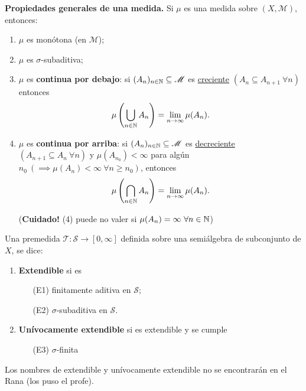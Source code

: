\noindent \textbf{Propiedades generales de una medida.} Si $\mu$ es una medida sobre $(X,\mathscr{M})$, entonces:
\begin{enumerate}
	\item $\mu$ es monótona (en $\mathscr{M}$);

	\item $\mu$ es $\sigma$-subaditiva;

	\item $\mu$ es \textbf{continua por debajo}: si $(A_n)_{n\in\mathbb{N}} \subseteq \mathscr{M}$ es \underline{creciente} $(A_n \subseteq A_{n+1}\ \forall n)$ entonces
	\[ \mu \left( \bigcup_{n\in\mathbb{N}} A_n \right) = \lim_{n \to \infty} \mu(A_n). \]

	\item $\mu$ es \textbf{continua por arriba}: si $(A_n)_{n\in\mathbb{N}} \subseteq \mathscr{M}$ es \underline{decreciente} $(A_{n+1} \subseteq A_n\ \forall n)$ y $\mu(A_{n_0})<\infty$ para algún $n_0\ (\implies \mu(A_n)<\infty\ \forall n\geq n_0)$, entonces
	\[ \mu \left( \bigcap_{n\in\mathbb{N}}A_n \right) = \lim_{n \to \infty} \mu(A_n). \]

	\noindent (\textbf{Cuidado!} (4) puede no valer si $\mu (A_n) = \infty \ \forall n \in \mathbb{N}$)
\end{enumerate}

\begin{definition}
	Una premedida $\mathcal{T} : \mathscr{S} \to [0,\infty]$ definida sobre una semiálgebra de subconjunto de $X$, se dice:
	\begin{enumerate}
		\item \textbf{Extendible} si es
		\begin{enumerate}
			\item[(E1)] finitamente aditiva en $\mathscr{S}$;

			\item[(E2)] $\sigma$-subaditiva en $\mathscr{S}$.
		\end{enumerate}

		\item \textbf{Unívocamente extendible} si es extendible y se cumple
		\begin{enumerate}
			\item[(E3)] $\sigma$-finita
		\end{enumerate}
	\end{enumerate}
\end{definition}

\begin{remark}
	Los nombres de extendible y unívocamente extendible no se encontrarán en el Rana (los puso el profe).
\end{remark}

